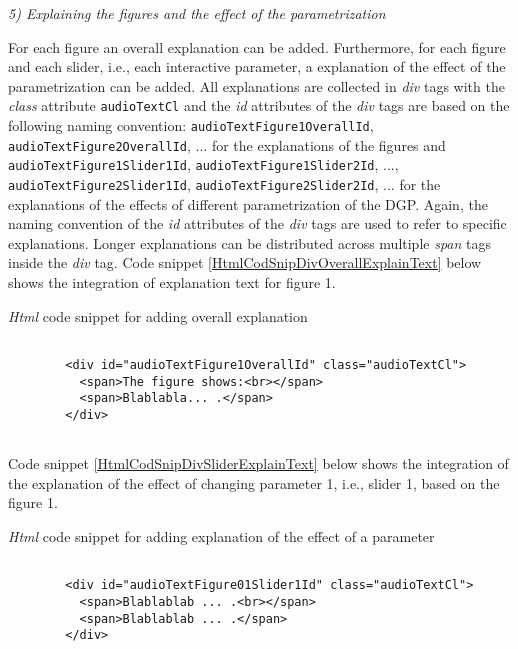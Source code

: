 \documentclass[12pt]{article}
\begin{document}

\vspace{1em}
\noindent\emph{5) Explaining the figures and the effect of the parametrization}

For each figure an overall explanation can be added. 
% 
Furthermore, for each figure and each slider, i.e., each interactive parameter, a explanation of the effect of the parametrization can be added. 
%
All explanations are collected in \emph{div} tags with the \emph{class} attribute \texttt{audioTextCl} and the \emph{id} attributes of the \emph{div} tags are based on the following naming convention: \texttt{audioTextFigure1OverallId}, \texttt{audioTextFigure2OverallId}, ... for the explanations of the figures and \texttt{audioTextFigure1Slider1Id}, \texttt{audioTextFigure1Slider2Id}, ..., \texttt{audioTextFigure2Slider1Id}, \texttt{audioTextFigure2Slider2Id}, ... for the explanations of the effects of different parametrization of the DGP. 
%
Again, the naming convention of the \emph{id} attributes of the \emph{div} tags are used to refer to specific explanations. 
%
Longer explanations can be distributed across multiple \emph{span} tags inside the \emph{div} tag. 
%
Code snippet \ref{HtmlCodSnipDivOverallExplainText} below shows the integration of explanation text for figure 1. 
%
\begin{CodeSnippet}[!hp]
	\centering
	\caption{\emph{Html} code snippet for adding overall explanation}
	\footnotesize
	\vspace{0.25cm}
	\begin{BVerbatim}
		
    	<div id="audioTextFigure1OverallId" class="audioTextCl">
		  <span>The figure shows:<br></span>
		  <span>Blablabla... .</span>
		</div>
		
	\end{BVerbatim}
	\label{HtmlCodSnipDivOverallExplainText}
\end{CodeSnippet}
%
Code snippet \ref{HtmlCodSnipDivSliderExplainText} below shows the integration of the explanation of the effect of changing parameter 1, i.e., slider 1, based on the figure 1. 
%
\begin{CodeSnippet}[!hp]
	\centering
	\caption{\emph{Html} code snippet for adding explanation of the effect of a parameter}
	\footnotesize
	\vspace{0.25cm}
	\begin{BVerbatim}
		
     	<div id="audioTextFigure01Slider1Id" class="audioTextCl">
		  <span>Blablablab ... .<br></span>
		  <span>Blablablab ... .</span>
		</div>
		
	\end{BVerbatim}
	\label{HtmlCodSnipDivSliderExplainText}
\end{CodeSnippet}
\end{document}
